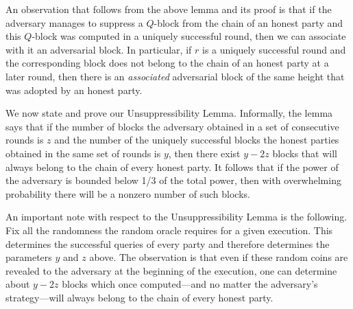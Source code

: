 An observation that follows from the above lemma and its proof is that if
the adversary manages to suppress a $Q$-block from the chain of an honest party
and this $Q$-block was computed in a uniquely successful round,
then we can associate with it an adversarial block.
In particular, if $r$ is a uniquely successful round and the corresponding
block does not belong to the chain of an honest party at a later round, then
there is an \emph{associated} adversarial block of the same height that was
adopted by an honest party.

We now state and prove our Unsuppressibility Lemma. Informally, the lemma says that if the
number of blocks the adversary obtained in a set of consecutive rounds is $z$
and the number of the uniquely successful blocks the honest parties obtained
in the same set of rounds is $y$, then there exist $y-2z$ blocks that will
always belong to the chain of every honest party.
It follows that if the power of the adversary is bounded below 1/3 of the
total power, then with overwhelming probability there will be a nonzero number of such
blocks.

An important note with respect to the Unsuppressibility Lemma is the following.
Fix all the randomness the random oracle requires for a given execution.
This determines the successful queries of every party and therefore determines
the parameters $y$ and $z$ above. The observation is that even if these
random coins are revealed to the adversary at the beginning of the execution,
one can determine about $y-2z$ blocks which once computed---and no matter the
adversary's strategy---will always belong to the chain of every honest party.

